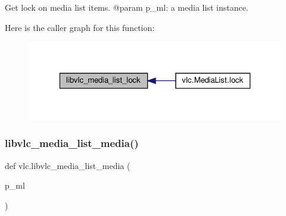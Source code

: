 \begin{DoxyVerb}Get lock on media list items.
@param p_ml: a media list instance.
\end{DoxyVerb}
 Here is the caller graph for this function\+:
\nopagebreak
\begin{figure}[H]
\begin{center}
\leavevmode
\includegraphics[width=323pt]{namespacevlc_aec544fc1d8f2faa7ec426291fe7cd3da_icgraph}
\end{center}
\end{figure}
\mbox{\label{namespacevlc_a9057b31381e40f017185409aaf8c8ab7}} 
\subsubsection{\texorpdfstring{libvlc\+\_\+media\+\_\+list\+\_\+media()}{libvlc\_media\_list\_media()}}
{\footnotesize\ttfamily def vlc.\+libvlc\+\_\+media\+\_\+list\+\_\+media (\begin{DoxyParamCaption}\item[{}]{p\+\_\+ml }\end{DoxyParamCaption})}

